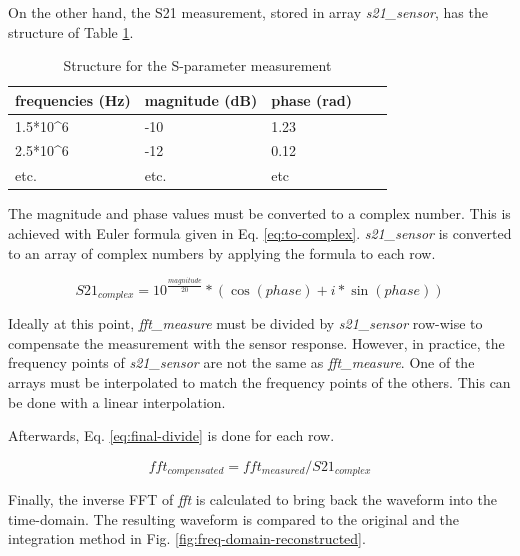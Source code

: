 On the other hand, the S21 measurement, stored in array \textit{s21\_sensor}, has the structure of Table \ref{tab:sparams}.

\begin{table}[!h]
  \centering
  \begin{tabular}{@{}lllll@{}}
  \toprule
  frequencies (Hz)          & magnitude (dB)         & phase (rad)     \\ \midrule
  1.5*10^6                  & -10                    & 1.23            \\
  2.5*10^6                  & -12                    & 0.12            \\
  etc.                      & etc.                   & etc             \\ \bottomrule
  \end{tabular}
  \caption{Structure for the S-parameter measurement}
  \label{tab:sparams}
\end{table}

The magnitude and phase values must be converted to a complex number.
This is achieved with Euler formula given in Eq. \ref{eq:to-complex}.
\textit{s21\_sensor} is converted to an array of complex numbers by applying the formula to each row.

\begin{equation} \label{eq:to-complex}
  S21_{complex} = 10^{\frac{magnitude}{20}} * (\cos(phase) + i*\sin(phase))
\end{equation}

Ideally at this point, \textit{fft\_measure} must be divided by \textit{s21\_sensor} row-wise to compensate the measurement with the sensor response.
However, in practice, the frequency points of \textit{s21\_sensor} are not the same as \textit{fft\_measure}.
One of the arrays must be interpolated to match the frequency points of the others.
This can be done with a linear interpolation.

Afterwards, Eq. \ref{eq:final-divide} is done for each row.

\begin{equation} \label{eq:final-divide}
  fft_{compensated} = fft_{measured} / S21_{complex}
\end{equation}

Finally, the inverse FFT of \textit{fft\compensated} is calculated to bring back the waveform into the time-domain.
The resulting waveform is compared to the original and the integration method in Fig. \ref{fig:freq-domain-reconstructed}.

